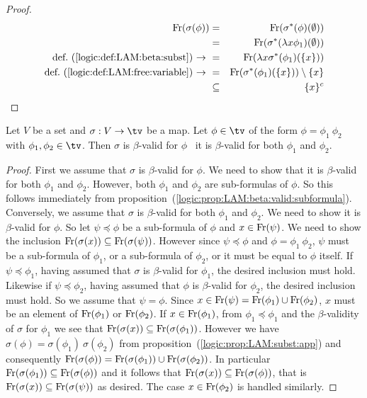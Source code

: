 \begin{proof}
    \begin{eqnarray*}
        \mbox{\rm Fr}(\sigma(\phi))
        &=&\mbox{\rm Fr}(\sigma^{*}(\phi)(\emptyset))\\
        &=&\mbox{\rm Fr}(\sigma^{*}(\lambda x\phi_{1})(\emptyset))\\
        \mbox{def.~(\ref{logic:def:LAM:beta:subst})$\ \rightarrow\ $}
        &=&\mbox{\rm Fr}(\lambda x \sigma^{*}(\phi_{1})(\{x\}))\\
        \mbox{def.~(\ref{logic:def:LAM:free:variable})$\ \rightarrow\ $}
        &=&\mbox{\rm Fr}(\sigma^{*}(\phi_{1})(\{x\}))\setminus\{x\}\\
        &\subseteq&\{x\}^{c}
    \end{eqnarray*}
\end{proof}

\begin{prop}\label{logic:prop:LAM:beta:valid:recursion:app}
    Let $V$ be a set and $\sigma:V\to\tv$ be a map. Let $\phi\in\tv$ 
    of the form $\phi=\phi_{1}\ \phi_{2}$ with $\phi_{1},\phi_{2}\in\tv$. 
    Then $\sigma$ is $\beta$-valid for $\phi$ \ifand\ it is $\beta$-valid 
    for both $\phi_{1}$ and $\phi_{2}$.
\end{prop}
\begin{proof}
    First we assume that $\sigma$ is $\beta$-valid for $\phi$. We need to 
    show that it is $\beta$-valid for both $\phi_{1}$ and $\phi_{2}$. 
    However, both $\phi_{1}$ and $\phi_{2}$ are sub-formulas of $\phi$.
    So this follows immediately from 
    proposition~(\ref{logic:prop:LAM:beta:valid:subformula}). 
    Conversely, we assume that $\sigma$ is $\beta$-valid for both $\phi_{1}$
    and $\phi_{2}$. We need to show it is $\beta$-valid for $\phi$. So let
    $\psi\preceq\phi$ be a sub-formula of $\phi$ and $x\in\mbox{\rm Fr}(\psi)$.
    We need to show the inclusion $\mbox{\rm Fr}(\sigma(x))\subseteq\mbox{\rm Fr}(\sigma(\psi))$.
    However since $\psi\preceq\phi$ and $\phi=\phi_{1}\ \phi_{2}$, $\psi$ 
    must be a sub-formula of $\phi_{1}$, or a sub-formula of $\phi_{2}$, 
    or it must be equal to $\phi$ itself. If $\psi\preceq\phi_{1}$, having
    assumed that $\sigma$ is $\beta$-valid for $\phi_{1}$, the desired 
    inclusion must hold. Likewise if $\psi\preceq\phi_{2}$, having assumed
    that $\phi$ is $\beta$-valid for $\phi_{2}$, the desired inclusion 
    must hold. So we assume that $\psi=\phi$. Since 
    $x\in\mbox{\rm Fr}(\psi)=\mbox{\rm Fr}(\phi_{1})\cup\mbox{\rm Fr}(\phi_{2})$, $x$ must be an 
    element of $\mbox{\rm Fr}(\phi_{1})$ or $\mbox{\rm Fr}(\phi_{2})$. If $x\in\mbox{\rm Fr}(\phi_{1})$,
    from $\phi_{1}\preceq\phi_{1}$ and the $\beta$-validity of $\sigma$ for 
    $\phi_{1}$ we see that $\mbox{\rm Fr}(\sigma(x))\subseteq\mbox{\rm Fr}(\sigma(\phi_{1}))$.
    However we have $\sigma(\phi)=\sigma(\phi_{1})\ \sigma(\phi_{2})$ from 
    proposition~(\ref{logic:prop:LAM:subst:app}) and consequently
    $\mbox{\rm Fr}(\sigma(\phi))=\mbox{\rm Fr}(\sigma(\phi_{1}))\cup\mbox{\rm Fr}(\sigma(\phi_{2}))$.
    In particular $\mbox{\rm Fr}(\sigma(\phi_{1}))\subseteq\mbox{\rm Fr}(\sigma(\phi))$ and
    it follows that 
    $\mbox{\rm Fr}(\sigma(x))\subseteq\mbox{\rm Fr}(\sigma(\phi))$, that is
    $\mbox{\rm Fr}(\sigma(x))\subseteq\mbox{\rm Fr}(\sigma(\psi))$ as desired.
    The case $x\in\mbox{\rm Fr}(\phi_{2})$ is handled similarly.
\end{proof}

